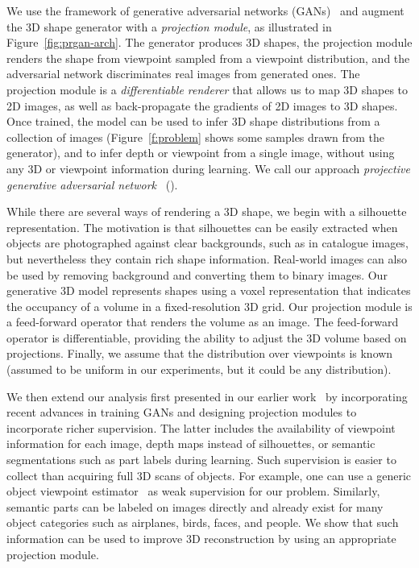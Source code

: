 We use the framework of generative adversarial
networks (GANs)~\cite{goodfellow2014generative} and augment the 3D shape
generator with a \emph{projection module}, as illustrated in Figure~\ref{fig:prgan-arch}.
The generator produces 3D shapes, the projection module
renders the shape from viewpoint sampled from a viewpoint distribution,
and the adversarial network discriminates real images from generated ones.
The projection module is a \emph{differentiable renderer} that allows us to map 3D
shapes to 2D images, as well as back-propagate the gradients of 2D
images to 3D shapes.
Once trained, the model can be used to infer 3D shape distributions
from a collection of images (Figure~\ref{f:problem} shows some samples
drawn from the generator), and to infer depth or viewpoint from a single
image, without using any 3D or viewpoint information during learning.
We call our approach \emph{projective generative adversarial network}
~(\prgan).








While there are several ways of rendering a 3D shape, we begin with a 
silhouette representation.
The motivation is that silhouettes can be easily
extracted when objects are photographed against clear backgrounds, such
as in catalogue images, but nevertheless they contain rich shape information.
Real-world images can also be used by removing background and converting them to
binary images. 
Our generative 3D model represents shapes using a voxel representation that indicates
the occupancy of a volume in a fixed-resolution 3D grid.
Our projection module is a feed-forward operator that
renders the volume as an image.
The feed-forward operator is differentiable, providing
the ability to adjust the 3D volume based on projections. 
Finally, we assume that the distribution over viewpoints
is known (assumed to be uniform in our experiments, but it could be any
distribution).

We then extend our analysis first presented in our earlier
work~\cite{prgan} by incorporating recent advances in training GANs and
designing projection modules to incorporate richer supervision.
The latter includes the availability of viewpoint information for
each image, depth maps instead of silhouettes, or semantic
segmentations such as part labels during learning.
Such supervision is easier to collect than acquiring full 3D scans of
objects.
For example, one can use a generic object viewpoint
estimator~\cite{su2015render} as weak supervision for our problem.
Similarly, semantic parts can be labeled on images directly and
already exist for many object categories such as airplanes, birds,
faces, and people.
We show that such information can be used to improve 3D reconstruction
by using an appropriate projection module.

